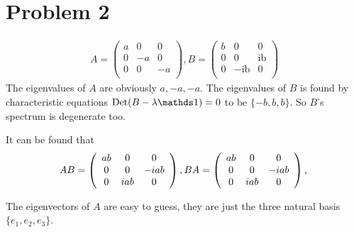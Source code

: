 \documentclass{article}
\begin{document}
\section*{Problem 2}
\label{sec:Problem 2}
\begin{align}
    A=\left( \begin{array}{ccc}
         a & 0 & 0 \\
         0 & -a & 0 \\
         0 & 0 & -a \\
    \end{array} \right), B=\left( \begin{array}{ccc}
                             b & 0 & 0 \\
                             0 & 0 & \text{ib} \\
                             0 & -\text{ib} & 0 \\
                        \end{array} \right)
\end{align}
The eigenvalues of $A$ are obviously $a,-a,-a$. The eigenvalues of $B$
is found by characteristic equations $\mathrm{Det}(B-\lambda \id)=0$ to be
$\{-b,b,b\}$. So $B$'s spectrum is degenerate too.

It can be found that
\begin{equation*}
    AB = \left( \begin{array}{ccc}
         a b & 0 & 0 \\
         0 & 0 & -i a b \\
         0 & i a b & 0 \\
        \end{array} \right), \\
    BA = \left( \begin{array}{ccc}
         a b & 0 & 0 \\
         0 & 0 & -i a b \\
         0 & i a b & 0 \\
        \end{array} \right), \\
\end{equation*}

The eigenvectors of $A$ are easy to guess, they are
just the three natural basis $\{e_1,e_2,e_3\}$. 
\end{document}
